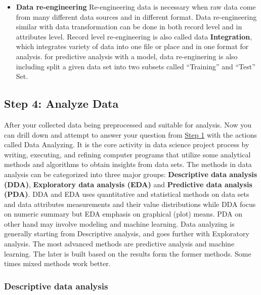 \documentclass[
]{book}
\begin{document}
\begin{itemize}
\item
  \textbf{Data re-engineering}
  Re-engineering data is necessary when raw data come from many different data sources and in different format. Data re-engineering similar with data transformation can be done in both record level and in attributes level. Record level re-engineering is also called data \textbf{Integration}, which integrates variety of data into one file or place and in one format for analysis. for predictive analysis with a model, data re-enginering is also including split a given data set into two subsets called ``Training'' and ``Test'' Set.
\end{itemize}

\hypertarget{analyse}{%
\subsection*{Step 4: Analyze Data}\label{analyse}}


After your collected data being preprocessed and suitable for analysis. Now you can drill down and attempt to answer your question from \protect\hyperlink{step1}{Step 1} with the actions called Data Analyzing. It is the core activity in data science project process by writing, executing, and refining computer programs that utilize some analytical methods and algorithms to obtain insights from data sets. The methods in data analysis can be categorized into three major groups: \textbf{Descriptive data analysis (DDA)}, \textbf{Exploratory data analysis (EDA)} and \textbf{Predictive data analysis (PDA)}. DDA and EDA uses quantitative and statistical methods on data sets and data attributes measurements and their value distributions while DDA focus on numeric summary but EDA emphasis on graphical (plot) means. PDA on other hand may involve modeling and machine learning. Data analyzing is generally starting from Descriptive analysis, and goes further with Exploratory analysis. The most advanced methods are predictive analysis and machine learning. The later is built based on the results form the former methods. Some times mixed methods work better.

\hypertarget{descriptive-data-analysis}{%
\subsubsection*{\texorpdfstring{\textbf{Descriptive data analysis}}{Descriptive data analysis}}\label{descriptive-data-analysis}}
\end{document}
